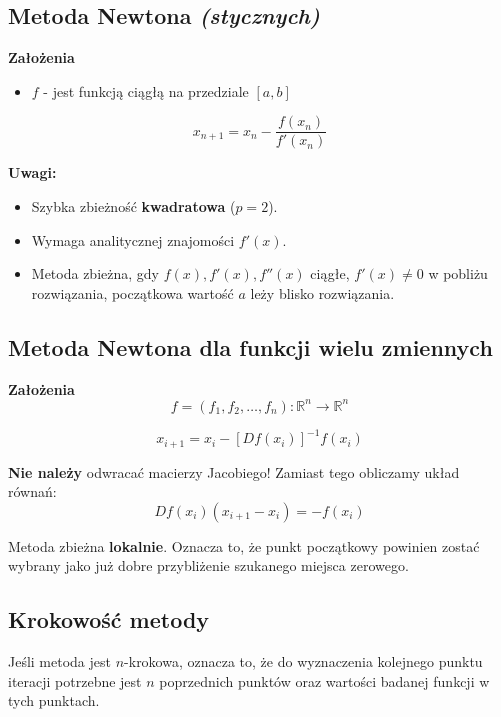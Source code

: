 \documentclass[../mn-notatki.tex]{subfiles}
\begin{document}
\subsection{Metoda Newtona \textit{(stycznych)}}

\textbf{Założenia}
\begin{itemize}
    \item $f$ - jest funkcją ciągłą na przedziale $[a,b]$
\end{itemize}

\begin{tcolorbox}
\[
x_{n+1} = x_n - \frac{f(x_n)}{f'(x_n)}
\]
\end{tcolorbox}

\textbf{Uwagi:}
\begin{itemize}
    \item Szybka zbieżność \textbf{kwadratowa} ($p = 2$).
    \item Wymaga analitycznej znajomości $f'(x)$.
    \item Metoda zbieżna, gdy $f(x), f'(x), f''(x)$ ciągłe,
    $f'(x) \neq 0$ w pobliżu rozwiązania, początkowa wartość $a$ leży blisko
    rozwiązania.
\end{itemize}

\subsection{Metoda Newtona dla funkcji wielu zmiennych}

\textbf{Założenia}
\[
f = (f_1, f_2, \ldots, f_n) : \mathbb{R}^n \rightarrow \mathbb{R}^n
\]

\begin{tcolorbox}
\[
x_{i+1} = x_i - \left[ D f(x_i) \right]^{-1} f(x_i)
\]

\textbf{Nie należy} odwracać macierzy Jacobiego!
Zamiast tego obliczamy układ równań:
\[
D f(x_i) (x_{i+1} - x_i) = -f(x_i)
\]
\end{tcolorbox}

Metoda zbieżna \textbf{lokalnie}. Oznacza to, że
punkt początkowy powinien zostać wybrany jako już dobre przybliżenie
szukanego miejsca zerowego.

\subsection{Krokowość metody}
\begin{tcolorbox}
Jeśli metoda jest  $n$-krokowa,
oznacza to, że do wyznaczenia kolejnego punktu iteracji potrzebne jest $n$
poprzednich punktów oraz wartości badanej funkcji w tych punktach.
\end{tcolorbox}

\pagebreak
\end{document}

